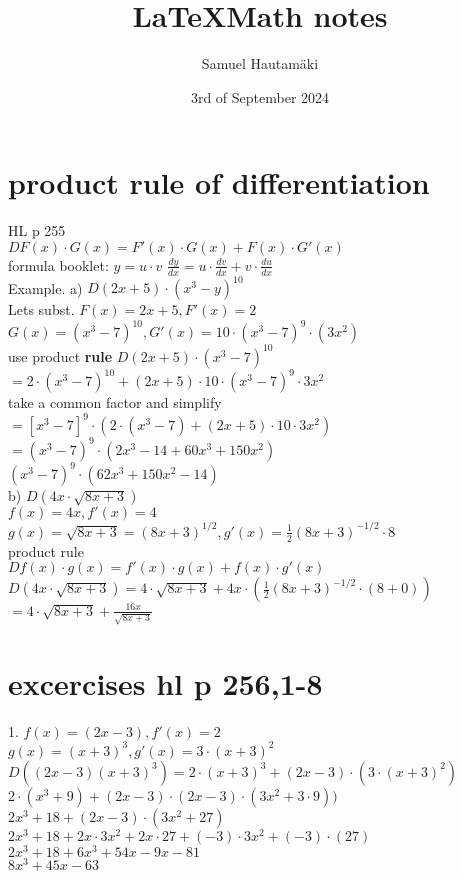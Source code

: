 \documentclass{article}
\title{\LaTeX Math notes}
\author{Samuel Hautamäki}
\date{3rd of September 2024}
\begin{document}
  \maketitle
   
  \section{product rule of differentiation}
  HL p 255\\
  $D F(x)\cdot G(x)= F'(x)\cdot G(x) + F(x)\cdot G'(x)$\\
  formula booklet: $y=u\cdot v$ $\frac{dy}{dx}=u\cdot \frac{dv}{dx}+v\cdot\frac{du}{dx}$\\
  Example. a) $D (2x+5)\cdot(x^3-y)^{10}$\\
  Lets subst. $F(x)=2x+5, F'(x)=2$\\
  $G(x)=(x^3-7)^{10}, G'(x)=10\cdot (x^3-7)^9\cdot (3x^2)$\\
  use product \textbf{rule} $D(2x+5)\cdot(x^3-7)^{10}$\\
  $=2\cdot(x^3-7)^{10}+(2x+5)\cdot10\cdot(x^3-7)^9\cdot3x^2$\\
  take a common factor and simplify\\ 
  $=[x^3-7]^9\cdot(2\cdot (x^3-7)+(2x+5)\cdot10\cdot3x^2)$\\
  $=(x^3-7)^9\cdot(2x^3-14+60x^3+150x^2)$\\
  $(x^3-7)^9\cdot(62x^3+150x^2-14)$\\
  b) $D(4x\cdot\sqrt{8x+3})$\\
  $f(x)=4x, f'(x)=4$\\
  $g(x)=\sqrt{8x+3}=(8x+3)^{1/2}, g'(x)=\frac{1}{2}(8x+3)^{-1/2}\cdot8$\\
  product rule\\
  $D f(x)\cdot g(x)=f'(x)\cdot g(x)+f(x)\cdot g'(x)$\\
  $D (4x\cdot\sqrt{8x+3})=4\cdot\sqrt{8x+3}+4x\cdot(\frac{1}{2}(8x+3)^{-1/2}\cdot(8+0))$\\
  $=4\cdot\sqrt{8x+3}+\frac{16x}{\sqrt{8x+3}}$\\
  \section{excercises hl p 256,1-8}
  1. $f(x)=(2x-3), f'(x)=2$\\
  $g(x)=(x+3)^3, g'(x)=3\cdot(x+3)^2$\\
  $D((2x-3)(x+3)^3) =2\cdot(x+3)^3+(2x-3)\cdot(3\cdot(x+3)^2)$\\
  $2\cdot(x^3+9)+(2x-3)\cdot(2x-3)\cdot(3x^2+3\cdot9))$\\
  $2x^3+18+(2x-3)\cdot(3x^2+27)$\\
  $2x^3+18+2x\cdot3x^2+2x\cdot27+(-3)\cdot3x^2+(-3)\cdot(27)$\\
  $2x^3+18+6x^3+54x-9x-81$\\
  $8x^3+45x-63$\\
  

   
\end{document}
